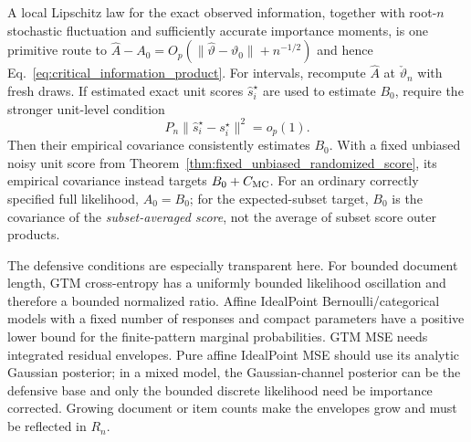 A local Lipschitz law for the exact observed information, together with
root-$n$ stochastic fluctuation and sufficiently accurate importance moments,
is one primitive route to
$\widehat A-A_0=O_p(\|\widehat\vartheta-\vartheta_0\|+n^{-1/2})$ and hence
Eq.~\eqref{eq:critical_information_product}.  For intervals, recompute
$\widehat A$ at $\check\vartheta_n$ with fresh draws.  If estimated exact unit
scores $\widehat s_i^\star$ are used to estimate $B_0$, require the stronger
unit-level condition
\begin{equation}
 P_n\|\widehat s_i^\star-s_i^\star\|^2=o_p(1).
 \label{eq:unit_score_l2_covariance_condition}
\end{equation}
Then their empirical covariance consistently estimates $B_0$.  With a fixed
unbiased noisy unit score from
Theorem~\ref{thm:fixed_unbiased_randomized_score}, its empirical covariance
instead targets $B_0+C_{\rm MC}$.  For an ordinary correctly specified full
likelihood, $A_0=B_0$; for the expected-subset target, $B_0$ is the covariance
of the \emph{subset-averaged score}, not the average of subset score outer
products.

The defensive conditions are especially transparent here.  For bounded
document length, GTM cross-entropy has a uniformly bounded likelihood
oscillation and therefore a bounded normalized ratio.  Affine IdealPoint
Bernoulli/categorical models with a fixed number of responses and compact
parameters have a positive lower bound for the finite-pattern marginal
probabilities.  GTM MSE needs integrated residual envelopes.  Pure affine
IdealPoint MSE should use its analytic Gaussian posterior; in a mixed model,
the Gaussian-channel posterior can be the defensive base and only the bounded
discrete likelihood need be importance corrected.  Growing document or item
counts make the envelopes grow and must be reflected in $R_n$.

